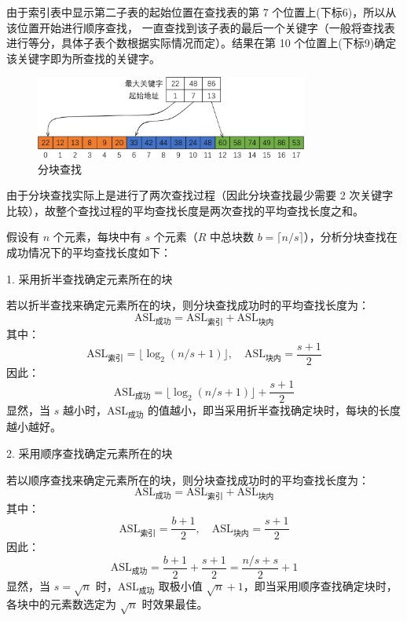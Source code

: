 \documentclass[lang=cn,newtx,10pt,scheme=chinese]{../elegantbook}
\begin{document}
由于索引表中显示第二子表的起始位置在查找表的第 7 个位置上(下标6)，所以从该位置开始进行顺序查找，
一直查找到该子表的最后一个关键字（一般将查找表进行等分，具体子表个数根据实际情况而定）。结果在第 10 个位置上(下标9)确定该关键字即为所查找的关键字。

\begin{figure}
  
    \centering
    \includegraphics[width=0.8\textwidth]{./figure/pdf/cropped/indexTable.pdf}
    \caption{分块查找}
    \label{fig:blockSearch}

\end{figure}


由于分块查找实际上是进行了两次查找过程（因此分块查找最少需要 2 次关键字比较），故整个查找过程的平均查找长度是两次查找的平均查找长度之和。

假设有 $n$ 个元素，每块中有 $s$ 个元素（$R$ 中总块数 $b = \lceil n/s \rceil$），分析分块查找在成功情况下的平均查找长度如下：

1. 采用折半查找确定元素所在的块  

   若以折半查找来确定元素所在的块，则分块查找成功时的平均查找长度为：
   \[
   \text{ASL}_{\text{成功}} = \text{ASL}_{\text{索引}} + \text{ASL}_{\text{块内}}
   \]
   其中：
   \[
   \text{ASL}_{\text{索引}} = \lfloor \log_2 (n/s + 1) \rfloor, \quad \text{ASL}_{\text{块内}} = \frac{s+1}{2}
   \]
   因此：
   \[
   \text{ASL}_{\text{成功}} = \lfloor \log_2 (n/s + 1) \rfloor + \frac{s+1}{2}
   \]
   显然，当 $s$ 越小时，$\text{ASL}_{\text{成功}}$ 的值越小，即当采用折半查找确定块时，每块的长度越小越好。

2. 采用顺序查找确定元素所在的块  

   若以顺序查找来确定元素所在的块，则分块查找成功时的平均查找长度为：
   \[
   \text{ASL}_{\text{成功}} = \text{ASL}_{\text{索引}} + \text{ASL}_{\text{块内}}
   \]
   其中：
   \[
   \text{ASL}_{\text{索引}} = \frac{b+1}{2}, \quad \text{ASL}_{\text{块内}} = \frac{s+1}{2}
   \]
   因此：
   \[
   \text{ASL}_{\text{成功}} = \frac{b+1}{2} + \frac{s+1}{2} = \frac{n/s + s}{2} + 1
   \]
   显然，当 $s = \sqrt{n}$ 时，$\text{ASL}_{\text{成功}}$ 取极小值 $\sqrt{n} + 1$，即当采用顺序查找确定块时，各块中的元素数选定为 $\sqrt{n}$ 时效果最佳。
\end{document}
